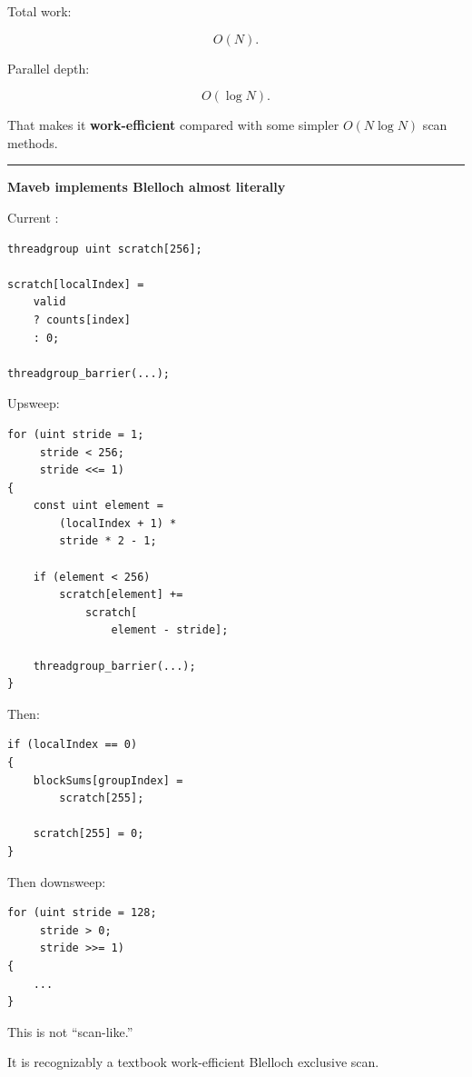 Total work:

\[
O(N).
\]

Parallel depth:

\[
O(\log N).
\]

That makes it \textbf{work-efficient} compared with some simpler \(O(N\log N)\) scan methods.

\begin{center}\rule{0.5\linewidth}{0.5pt}\end{center}

\textbf{Maveb implements Blelloch almost literally}

Current :

\protect{}\label{4ie3j5}%
\begin{verbatim}
threadgroup uint scratch[256];

scratch[localIndex] =
    valid
    ? counts[index]
    : 0;

threadgroup_barrier(...);
\end{verbatim}

Upsweep:

\protect{}\label{5188rr}%
\begin{verbatim}
for (uint stride = 1;
     stride < 256;
     stride <<= 1)
{
    const uint element =
        (localIndex + 1) *
        stride * 2 - 1;

    if (element < 256)
        scratch[element] +=
            scratch[
                element - stride];

    threadgroup_barrier(...);
}
\end{verbatim}

Then:

\protect{}\label{sz0hjf}%
\begin{verbatim}
if (localIndex == 0)
{
    blockSums[groupIndex] =
        scratch[255];

    scratch[255] = 0;
}
\end{verbatim}

Then downsweep:

\protect{}\label{67v40p}%
\begin{verbatim}
for (uint stride = 128;
     stride > 0;
     stride >>= 1)
{
    ...
}
\end{verbatim}

This is not ``scan-like.''

It is recognizably a textbook work-efficient Blelloch exclusive scan.

